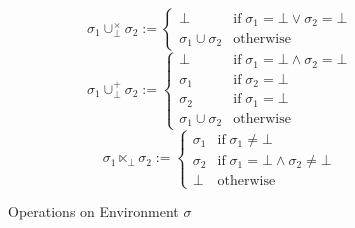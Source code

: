 \documentclass{jsarticle}
\begin{document}
\begin{figure}[H]
  \begin{equation*}
    \sigma_1\cup^\times_\bot\sigma_2 :=
    \begin{cases}
      \bot                 &\text{if}\;\sigma_1=\bot\vee\sigma_2=\bot \\
      \sigma_1\cup\sigma_2 &\text{otherwise}
    \end{cases}
  \end{equation*}
  \begin{equation*}
    \sigma_1\cup^+_\bot\sigma_2 :=
    \begin{cases}
      \bot                 &\text{if}\;\sigma_1=\bot\wedge\sigma_2=\bot \\
      \sigma_1             &\text{if}\;\sigma_2=\bot \\
      \sigma_2             &\text{if}\;\sigma_1=\bot \\
      \sigma_1\cup\sigma_2 &\text{otherwise}
    \end{cases}
  \end{equation*}
  \begin{equation*}
    \sigma_1\ltimes_\bot\sigma_2 :=
    \begin{cases}
      \sigma_1 &\text{if}\;\sigma_1\neq\bot \\
      \sigma_2 &\text{if}\;\sigma_1=\bot\wedge\sigma_2\neq\bot \\
      \bot     &\text{otherwise}
    \end{cases}
  \end{equation*}
  \caption{Operations on Environment $\sigma$}
  \label{fig:op_env}
\end{figure}
\end{document}
